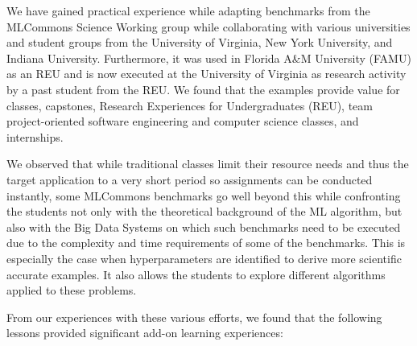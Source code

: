 \documentclass[utf8]{FrontiersinVancouver} %
\begin{document}
We have gained practical experience while adapting benchmarks from the
MLCommons Science Working group while collaborating with various
universities and student groups from the University of Virginia, New
York University, and Indiana University. Furthermore, it was used in
Florida A\&M University (FAMU) as an REU and is now executed at the
University of Virginia as research activity by a past student from the
REU. We found that the examples provide value for classes, capstones,
Research Experiences for Undergraduates (REU), team project-oriented
software engineering and computer science classes, and internships.

We observed that while traditional classes limit their resource needs
and thus the target application to a very short period so assignments
can be conducted instantly, some MLCommons benchmarks go well beyond
this while confronting the students not only with the theoretical
background of the ML algorithm, but also with the Big Data Systems on
which such benchmarks need to be executed due to the complexity and
time requirements of some of the benchmarks. This is especially the
case when hyperparameters are identified to derive more scientific
accurate examples. It also allows the students to explore different
algorithms applied to these problems.

From our experiences with these various efforts, we found that the
following lessons provided significant add-on learning experiences:
\end{document}
